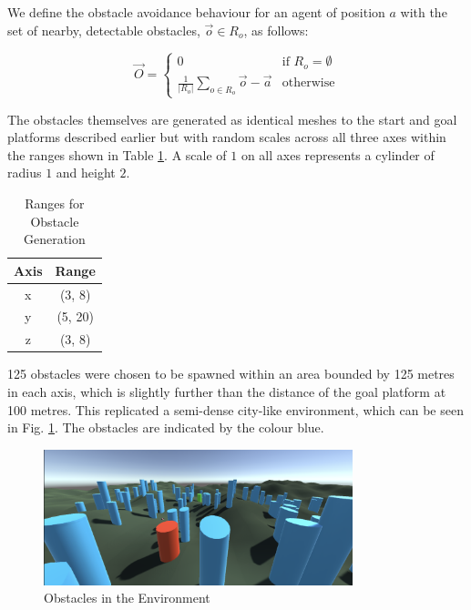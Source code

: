 \documentclass[12pt]{article}
\begin{document}
We define the obstacle avoidance behaviour for an agent of position $a$ with the set of nearby, detectable obstacles, $\vec{o} \in R_o$, as follows:

\begin{equation}
    \vec{O} = 
    \begin{cases}
    0 & \text{if } R_o = \emptyset \\
    \frac{1}{|R_o|}\sum_{o \in R_o} \vec{o} - \vec{a} & \text{otherwise}
    \end{cases}
\end{equation}

The obstacles themselves are generated as identical meshes to the start and goal platforms described earlier but with random scales across all three axes within the ranges shown in Table \ref{tab:obstacle-ranges}. A scale of $1$ on all axes represents a cylinder of radius $1$ and height $2$.

\begin{table}[ht]
    \centering
    \begin{tabular}{|c|c|}
        \hline
        Axis & Range \\
        \hline
        x & (3, 8) \\
        \hline
        y & (5, 20) \\
        \hline
        z & (3, 8) \\
        \hline
    \end{tabular}
    \caption{Ranges for Obstacle Generation}
    \label{tab:obstacle-ranges}
\end{table}

125 obstacles were chosen to be spawned within an area bounded by 125 metres in each axis, which is slightly further than the distance of the goal platform at 100 metres. This replicated a semi-dense city-like environment, which can be seen in Fig. \ref{fig:obstacles}. The obstacles are indicated by the colour blue.

\begin{figure}[ht]
    \centering
    \includegraphics[width=0.8\textwidth]{obstacles.png}
    \caption{Obstacles in the Environment}
    \label{fig:obstacles}
\end{figure}
\end{document}
